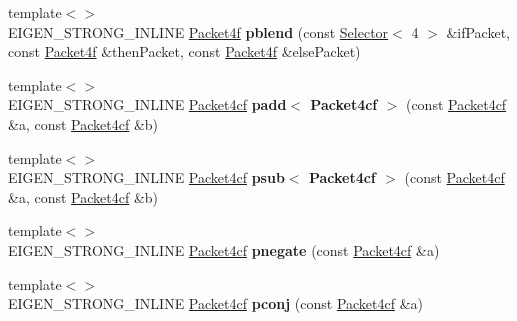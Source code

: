 \begin{DoxyCompactItemize}
\mbox{\label{namespace_eigen_1_1internal_abaadd9aa6aafdf268f71646684340302}} 
{\footnotesize template$<$$>$ }\\E\+I\+G\+E\+N\+\_\+\+S\+T\+R\+O\+N\+G\+\_\+\+I\+N\+L\+I\+NE \hyperlink{struct_eigen_1_1internal_1_1_packet4f}{Packet4f} {\bfseries pblend} (const \hyperlink{struct_eigen_1_1internal_1_1_selector}{Selector}$<$ 4 $>$ \&if\+Packet, const \hyperlink{struct_eigen_1_1internal_1_1_packet4f}{Packet4f} \&then\+Packet, const \hyperlink{struct_eigen_1_1internal_1_1_packet4f}{Packet4f} \&else\+Packet)
\item 
\mbox{\label{namespace_eigen_1_1internal_ab11a631dcbe3f6421c566d8b075a7889}} 
{\footnotesize template$<$$>$ }\\E\+I\+G\+E\+N\+\_\+\+S\+T\+R\+O\+N\+G\+\_\+\+I\+N\+L\+I\+NE \hyperlink{struct_eigen_1_1internal_1_1_packet4cf}{Packet4cf} {\bfseries padd$<$ Packet4cf $>$} (const \hyperlink{struct_eigen_1_1internal_1_1_packet4cf}{Packet4cf} \&a, const \hyperlink{struct_eigen_1_1internal_1_1_packet4cf}{Packet4cf} \&b)
\item 
\mbox{\label{namespace_eigen_1_1internal_a21c83eff21af7762489643fa896b1ecf}} 
{\footnotesize template$<$$>$ }\\E\+I\+G\+E\+N\+\_\+\+S\+T\+R\+O\+N\+G\+\_\+\+I\+N\+L\+I\+NE \hyperlink{struct_eigen_1_1internal_1_1_packet4cf}{Packet4cf} {\bfseries psub$<$ Packet4cf $>$} (const \hyperlink{struct_eigen_1_1internal_1_1_packet4cf}{Packet4cf} \&a, const \hyperlink{struct_eigen_1_1internal_1_1_packet4cf}{Packet4cf} \&b)
\item 
\mbox{\label{namespace_eigen_1_1internal_aaffa1cc24fdde8db729bbcaf5755a88a}} 
{\footnotesize template$<$$>$ }\\E\+I\+G\+E\+N\+\_\+\+S\+T\+R\+O\+N\+G\+\_\+\+I\+N\+L\+I\+NE \hyperlink{struct_eigen_1_1internal_1_1_packet4cf}{Packet4cf} {\bfseries pnegate} (const \hyperlink{struct_eigen_1_1internal_1_1_packet4cf}{Packet4cf} \&a)
\item 
\mbox{\label{namespace_eigen_1_1internal_a5e3a815054ebd3f85b712b0f656df759}} 
{\footnotesize template$<$$>$ }\\E\+I\+G\+E\+N\+\_\+\+S\+T\+R\+O\+N\+G\+\_\+\+I\+N\+L\+I\+NE \hyperlink{struct_eigen_1_1internal_1_1_packet4cf}{Packet4cf} {\bfseries pconj} (const \hyperlink{struct_eigen_1_1internal_1_1_packet4cf}{Packet4cf} \&a)

\end{DoxyCompactItemize}
